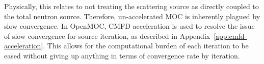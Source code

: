 Physically, this relates to not treating the scattering source as directly coupled to the total neutron source. Therefore, un-accelerated \ac{MOC} is inherently plagued by slow convergence. In OpenMOC, \ac{CMFD} acceleration is used to resolve the issue of slow convergence for source iteration, as described in Appendix~\ref{app:cmfd-acceleration}. This allows for the computational burden of each iteration to be eased without giving up anything in terms of convergence rate by iteration.